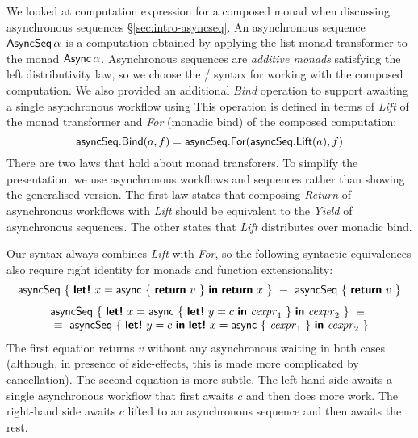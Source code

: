 \documentclass[runningheads,a4paper]{llncs}
\begin{document}
We looked at computation expression for a composed monad when discussing
asynchronous sequences \S\ref{sec:intro-asyncseq}. An asynchronous sequence $\textnormal{\sffamily AsyncSeq}\,\alpha$ 
is a computation obtained by applying the list monad transformer \cite{list-trans} to the 
monad $\textnormal{\sffamily Async}\,\alpha$. Asynchronous sequences are \emph{additive monads} satisfying 
the left distributivity law, so we choose the / syntax for working with 
the composed computation. We also provided an additional \emph{Bind} operation to support 
awaiting a single asynchronous workflow using  This operation is
defined in terms of \emph{Lift} of the monad transformer and \emph{For} (monadic bind) of the
composed computation:
%
\begin{equation*}
\ident{asyncSeq}.\ident{Bind}(a, f) = \ident{asyncSeq}.\ident{For}(\ident{asyncSeq}.\ident{Lift}(a), f)
\end{equation*}
%
There are two laws that hold about monad transforers. To simplify the presentation, we use asynchronous 
workflows and sequences rather than showing the generalised version. The first law states 
that composing \emph{Return} of asynchronous workflows with \emph{Lift} should be equivalent to the 
\emph{Yield} of asynchronous sequences. The other states that \emph{Lift} distributes over monadic
bind. 

Our syntax always combines \emph{Lift} with \emph{For}, so the following syntactic equivalences
also require right identity for monads and function extensionality:
%
\begin{equation*}
\begin{array}{c}
\ident{asyncSeq}~\{~ \kvd{let!}~x = \ident{async}~\{~\kvd{return}~v~\}~\kvd{in}~\kvd{return}~x ~\} ~\equiv~
  \ident{asyncSeq}~\{~ \kvd{return}~v ~\}
\\[0.7em]
\ident{asyncSeq}~\{~ \kvd{let!}~x = \ident{async}~\{~\kvd{let!}~y = c~\kvd{in}~\cexpr_1~\}~\kvd{in}~\cexpr_2 ~\} ~\equiv~\\
~\equiv~ \ident{asyncSeq}~\{~ \kvd{let!}~y = c~\kvd{in}~\kvd{let!}~x = \ident{async}~\{~\cexpr_1~\}~\kvd{in}~\cexpr_2 ~\}
\end{array}
\end{equation*}
%
The first equation returns $v$ without any asynchronous waiting in both cases
(although, in presence of side-effects, this is made more complicated by cancellation). 
The second equation is more subtle. The left-hand side awaits a single asynchronous workflow 
that first awaits $c$ and then does more work. The right-hand side awaits $c$ lifted to an 
asynchronous sequence and then awaits the rest.
\end{document}
